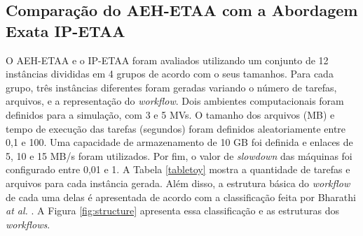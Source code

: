 \subsection{Comparação do AEH-ETAA com a Abordagem Exata IP-ETAA}\label{ssec:CompEX}

O AEH-ETAA e o IP-ETAA foram avaliados utilizando um conjunto de 12 instâncias divididas em 4 grupos de acordo com o seus tamanhos. Para cada grupo, três instâncias diferentes foram geradas variando o número de tarefas, arquivos, e a representação do \textit{workflow}. Dois ambientes computacionais foram definidos para a simulação, com 3 e 5 MVs. O tamanho dos arquivos (MB) e tempo de execução das tarefas (segundos) foram definidos aleatoriamente entre 0,1 e 100. Uma capacidade de armazenamento de 10 GB foi definida e enlaces de 5, 10 e 15 MB/s foram utilizados. Por fim, o valor de \textit{slowdown} das máquinas foi configurado entre 0,01 e 1. A Tabela \ref{tabletoy} mostra a quantidade de tarefas e arquivos para cada instância gerada. Além disso, a estrutura básica do \textit{workflow} de cada uma delas é apresentada de acordo com a classificação feita por Bharathi \textit{at al.} \cite{Bharathi2008}. A Figura \ref{fig:structure} apresenta essa classificação e as estruturas dos \textit{workflows}.


